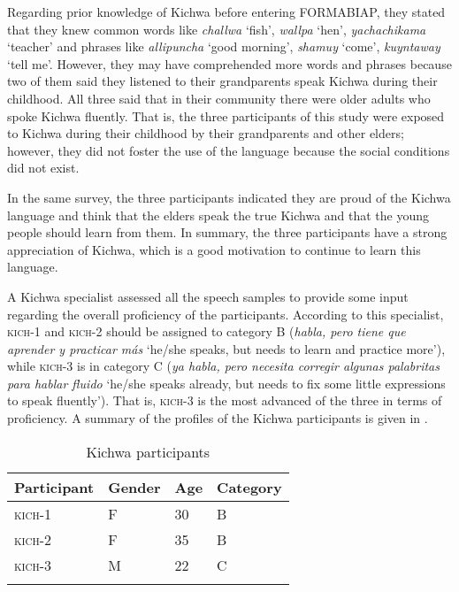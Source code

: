 \documentclass[output=paper]{langscibook}
\begin{document}
\begin{sloppypar}
Regarding prior knowledge of Kichwa before entering FORMABIAP, they stated that they knew common words like \textit{challwa} `fish', \textit{wallpa} `hen', \textit{yachachikama} `teacher' and phrases like \textit{allipuncha} `good morning', \textit{shamuy} `come', \textit{kuyntaway} `tell me'. However, they may have comprehended more words and phrases because two of them said they listened to their grandparents speak Kichwa during their childhood. All three said that in their community there were older adults who spoke Kichwa fluently. That is, the three participants of this study were exposed to Kichwa during their childhood by their grandparents and other elders; however, they did not foster the use of the language because the social conditions did not exist.
\end{sloppypar}

In the same survey, the three participants indicated they are proud of the Kichwa language and think that the elders speak the true Kichwa and that the young people should learn from them. In summary, the three participants have a strong appreciation of Kichwa, which is a good motivation to continue to learn this language.

A Kichwa specialist assessed all the speech samples to provide some input regarding the overall proficiency of the participants. According to this specialist, \textsc{kich}{}-1 and \textsc{kich}{}-2 should be assigned to category B (\textit{habla, pero tiene que aprender y practicar más} `he/she speaks, but needs to learn and practice more'), while \textsc{kich}{}-3 is in category C (\textit{ya habla, pero necesita corregir algunas palabritas para hablar fluido} `he/she speaks already, but needs to fix some little expressions to speak fluently'). That is, \textsc{kich}{}-3 is the most advanced of the three in terms of proficiency. A summary of the profiles of the Kichwa participants is given in .

\begin{table}
\caption{Kichwa participants}
  \label{tab:7:3}
\begin{tabularx}{\textwidth}{QXXl}
\lsptoprule
Participant & Gender & Age & Category\\
\midrule
\textsc{kich-}1 & F & 30 & B\\
\textsc{kich-}2 & F & 35 & B\\
\textsc{kich-}3 & M & 22 & C\\
\lspbottomrule
\end{tabularx}
\end{table}
\end{document}
